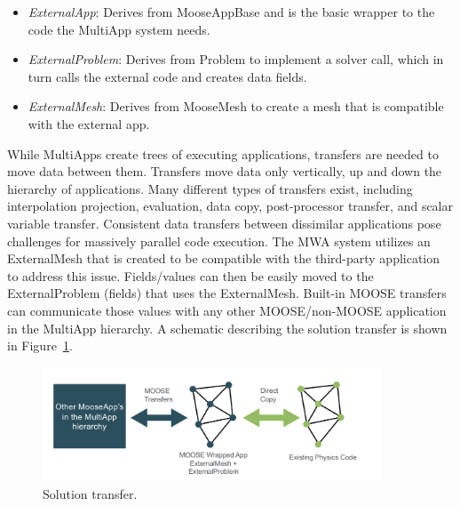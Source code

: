 \begin{itemize}
    \item \textit{ExternalApp}: Derives from MooseAppBase and is the basic wrapper to the code the MultiApp
    system needs.
    \item \textit{ExternalProblem}: Derives from Problem to implement a solver call, which in turn calls the external code and creates data fields.
    \item \textit{ExternalMesh}: Derives from MooseMesh to create a mesh that is compatible with the external app.
\end{itemize}
While MultiApps create trees of executing applications, transfers are needed to move data between them. Transfers move data only vertically, up and down the hierarchy of applications. Many different types of transfers exist, including interpolation projection, evaluation, data copy, post-processor transfer, and scalar variable transfer.
Consistent data transfers between dissimilar applications pose challenges for massively parallel code execution.  The MWA system utilizes an ExternalMesh that is created to be compatible with the third-party application to address this issue. Fields/values can then be easily moved to the ExternalProblem (fields) that uses the ExternalMesh. Built-in MOOSE transfers can communicate those values with any other MOOSE/non-MOOSE application in the MultiApp hierarchy. A schematic describing the solution transfer is shown in Figure~\ref{f:moose2}.

\begin{figure}[!h]
\centering
\includegraphics[clip=true,width=0.9\textwidth]{Figures/moose2}
\caption{Solution transfer.}
\label{f:moose2}
\end{figure}

